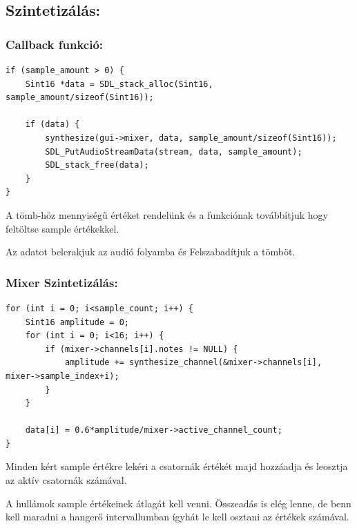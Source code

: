 \documentclass{article}
\begin{document}
\subsection{Szintetizálás:}

\subsubsection{Callback funkció:}
\begin{lstlisting}[caption={\code{synth_callback()} funkció belseje}]
if (sample_amount > 0) {  
    Sint16 *data = SDL_stack_alloc(Sint16, sample_amount/sizeof(Sint16)); 

    if (data) {  
        synthesize(gui->mixer, data, sample_amount/sizeof(Sint16));
        SDL_PutAudioStreamData(stream, data, sample_amount);  
        SDL_stack_free(data);  
    }  
} 
\end{lstlisting}

A  tömb-höz  mennyiségű 
értéket rendelünk és a  funkciónak továbbítjuk
hogy feltöltse sample értékekkel.

Az adatot belerakjuk az audió folyamba és Felszabadítjuk a 
tömböt.

\subsubsection{Mixer Szintetizálás:}
\begin{lstlisting}[caption={\code{synthesize()} funkció belseje}]
for (int i = 0; i<sample_count; i++) {
    Sint16 amplitude = 0;
    for (int i = 0; i<16; i++) {
        if (mixer->channels[i].notes != NULL) {
            amplitude += synthesize_channel(&mixer->channels[i], mixer->sample_index+i);
        }
    }

    data[i] = 0.6*amplitude/mixer->active_channel_count;
}
\end{lstlisting}

Minden kért sample értékre lekéri a csatornák értékét 
majd hozzáadja és leosztja az aktív csatornák számával.

\begin{cnote}
    A hullámok sample értékeinek átlagát kell venni.
    Összeadás is elég lenne, de benn kell maradni a 
    hangerő intervallumban ígyhát le kell osztani az 
    értékek számával.
\end{cnote}
\end{document}
